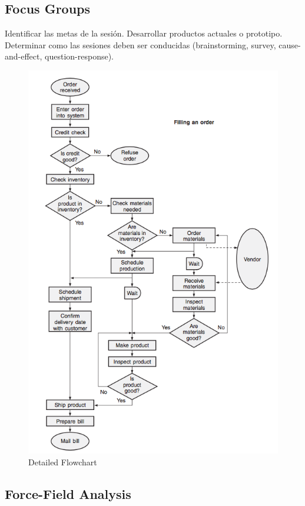 \documentclass[]{article}
\begin{document}
\subsection{Focus Groups}

Identificar las metas de la sesión. Desarrollar productos actuales o prototipo. Determinar como las sesiones deben ser conducidas (brainstorming, survey, cause-and-effect, question-response).

\begin{figure}[ht!]
	\centering
	\includegraphics[width=120mm]{imagenes/DetailedFlowchart.png}
	\caption{Detailed Flowchart}
	\label{fig:DetailedFlowchart}
\end{figure}

\subsection{Force-Field Analysis}
\end{document}

